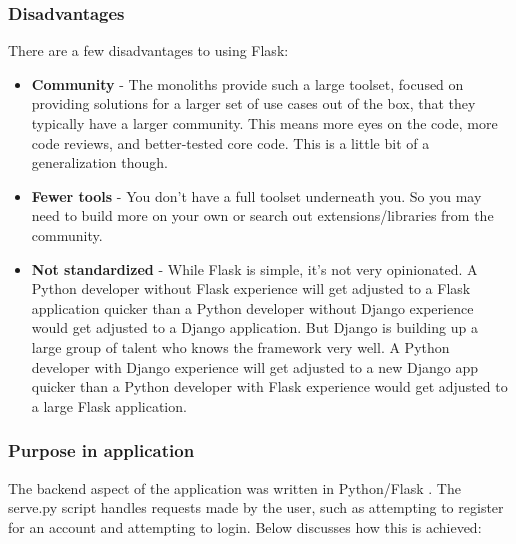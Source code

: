 \subsubsection{Disadvantages}
There are a few disadvantages to using Flask:

\begin{itemize}
    \item \textbf{Community} - The monoliths provide such a large toolset,
    focused on providing solutions for a larger set of use cases out of the box,
    that they typically have a larger community. This means more eyes on the
    code, more code reviews, and better-tested core code. This is a little bit
    of a generalization though.
    \item \textbf{Fewer tools} -  You don’t have a full toolset underneath you.
    So you may need to build more on your own or search out extensions/libraries
    from the community.
    \item \textbf{Not standardized} - While Flask is simple, it’s
    not very opinionated. A Python developer without Flask experience will get 
    adjusted to a Flask application quicker than a Python developer without 
    Django experience would get adjusted to a Django application. But Django is 
    building up a large group of talent who knows the framework very well. A 
    Python developer with Django experience will get adjusted to a new Django 
    app quicker than a Python developer with Flask experience would get adjusted
    to a large Flask application.
\end{itemize}

\newpage
\subsubsection{Purpose in application}
The backend aspect of the application was written in Python/Flask \cite{frm_logreg}. The serve.py script handles requests made by the user, such as attempting to register for an account and attempting to login. Below discusses how this is achieved:

